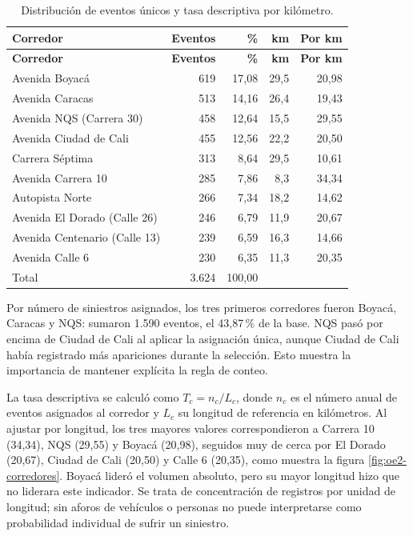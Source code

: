 \documentclass[12pt,letterpaper]{article}
\begin{document}
\begingroup
\begin{longtable}{@{}L{0.43}R{0.15}R{0.13}R{0.12}R{0.17}@{}}
\caption{Distribución de eventos únicos y tasa descriptiva por kilómetro.}\label{tab:distribucion-corredores}\\
\toprule
\textbf{Corredor} & \textbf{Eventos} & \textbf{\%} & \textbf{km} & \textbf{Por km}\\
\midrule
\endfirsthead
\toprule
\textbf{Corredor} & \textbf{Eventos} & \textbf{\%} & \textbf{km} & \textbf{Por km}\\
\midrule
\endhead
Avenida Boyacá & 619 & 17,08 & 29,5 & 20,98\\
Avenida Caracas & 513 & 14,16 & 26,4 & 19,43\\
Avenida NQS (Carrera 30) & 458 & 12,64 & 15,5 & 29,55\\
Avenida Ciudad de Cali & 455 & 12,56 & 22,2 & 20,50\\
Carrera Séptima & 313 & 8,64 & 29,5 & 10,61\\
Avenida Carrera 10 & 285 & 7,86 & 8,3 & 34,34\\
Autopista Norte & 266 & 7,34 & 18,2 & 14,62\\
Avenida El Dorado (Calle 26) & 246 & 6,79 & 11,9 & 20,67\\
Avenida Centenario (Calle 13) & 239 & 6,59 & 16,3 & 14,66\\
Avenida Calle 6 & 230 & 6,35 & 11,3 & 20,35\\
\midrule
Total & 3.624 & 100,00 & & \\
\bottomrule
\end{longtable}
\endgroup

Por número de siniestros asignados, los tres primeros corredores fueron
Boyacá, Caracas y NQS: sumaron 1.590 eventos, el 43,87\,\% de la base.
NQS pasó por encima de Ciudad de Cali al aplicar la asignación única,
aunque Ciudad de Cali había registrado más apariciones durante la
selección. Esto muestra la importancia de mantener explícita la regla
de conteo.

La tasa descriptiva se calculó como $T_c=n_c/L_c$, donde $n_c$ es el
número anual de eventos asignados al corredor y $L_c$ su longitud de
referencia en kilómetros. Al ajustar por longitud, los tres mayores
valores correspondieron a Carrera 10 (34,34), NQS (29,55) y Boyacá
(20,98), seguidos muy de cerca por El Dorado (20,67), Ciudad de Cali
(20,50) y Calle 6 (20,35), como muestra la figura \ref{fig:oe2-corredores}. Boyacá lideró
el volumen absoluto, pero su mayor longitud hizo que no liderara este
indicador. Se trata de concentración de registros por unidad de longitud;
sin aforos de vehículos o personas no puede interpretarse como
probabilidad individual de sufrir un siniestro.
\end{document}

